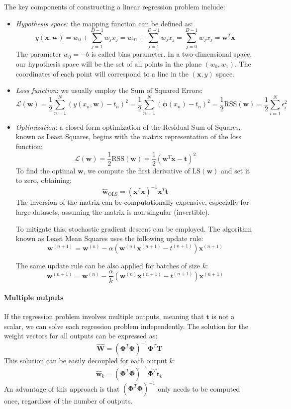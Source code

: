 The key components of constructing a linear regression problem include:
\begin{itemize}
    \item \textit{Hypothesis space}: the mapping function can be defined as: 
        \[y(\mathbf{x},\mathbf{w})=w_0+\sum_{j=1}^{D-1}w_j x_j=w_01+\sum_{j=1}^{D-1}w_j x_j=\sum_{j=0}^{D-1}w_j x_j=\mathbf{w}^T\mathbf{x}\]
        The parameter $w_0=-b$ is called bias parameter. 
        In a two-dimensional space, our hypothesis space will be the set of all points in the plane $(w_0,w_1)$. 
        The coordinates of each point will correspond to a line in the $\left( \mathbf{x}, y \right)$ space.
    \item \textit{Loss function}: we usually employ the Sum of Squared Errors: 
        \[\mathcal{L}(\mathbf{w})=\dfrac{1}{2}\sum_{n=1}^{N}{\left( y(x_n, \mathbf{w})-t_n \right)}^2=\dfrac{1}{2}\sum_{n=1}^{N}{\left( \boldsymbol{\phi}(x_n)-t_n \right)}^2=\dfrac{1}{2}\text{RSS}(\mathbf{w})=\dfrac{1}{2}\sum_{i=1}^{N}\epsilon^2_i\]
    \item \textit{Optimization}: a closed-form optimization of the Residual Sum of Squares, known as Least Squares, begins with the matrix representation of the loss function:
        \[\mathcal{L}(\mathbf{w})=\dfrac{1}{2}\text{RSS}(\mathbf{w})=\dfrac{1}{2}{\left( \mathbf{w}^T\mathbf{x}-\mathbf{t} \right)}^2\]
        To find the optimal $\mathbf{w}$, we compute the first derivative of $\text{LS}(\mathbf{w})$ and set it to zero, obtaining: 
        \[\hat{\mathbf{w}}_{\text{OLS}}=(\mathbf{x}^T\mathbf{x})^{-1}\mathbf{x}^T\mathbf{t}\]
        The inversion of the matrix can be computationally expensive, especially for large datasets, assuming the matrix is non-singular (invertible). 
        
        To mitigate this, stochastic gradient descent can be employed.
        The algorithm known as Least Mean Squares uses the following update rule:
        \[\mathbf{w}^{(n+1)}= \mathbf{w}^{(n)}-\alpha\left( \mathbf{w}^{(n)}\mathbf{x}^{(n+1)}-t^{(n+1)} \right)\mathbf{x}^{(n+1)}\]

        The same update rule can be also applied for batches of size $k$: 
        \[\mathbf{w}^{(n+1)}= \mathbf{w}^{(n)}-\dfrac{\alpha}{k}\left( \mathbf{w}^{(n)}\mathbf{x}^{(n+1)}-t^{(n+1)} \right)\mathbf{x}^{(n+1)}\]
\end{itemize}

\paragraph*{Multiple outputs}
If the regression problem involves multiple outputs, meaning that $\mathbf{t}$ is not a scalar, we can solve each regression problem independently.
The solution for the weight vectors for all outputs can be expressed as:
\[\hat{\mathbf{W}}={\left( \boldsymbol{\Phi}^T\boldsymbol{\Phi}\right)}^{-1}\boldsymbol{\Phi}^T\mathbf{T}\]
This solution can be easily decoupled for each output $k$: 
\[\hat{\mathbf{w}}_k={\left( \boldsymbol{\Phi}^T\boldsymbol{\Phi}\right)}^{-1}\boldsymbol{\Phi}^T\mathbf{t}_k\]
An advantage of this approach is that ${\left( \boldsymbol{\Phi}^T\boldsymbol{\Phi}\right)}^{-1}$ only needs to be computed once, regardless of the number of outputs.

